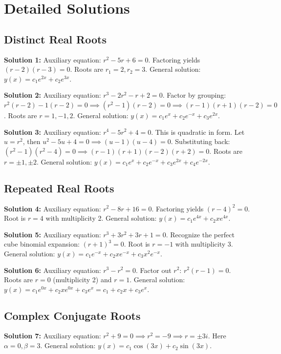 \documentclass[12pt]{article}
\begin{document}
\newpage

\section{Detailed Solutions}

\subsection*{Distinct Real Roots}
\textbf{Solution 1:} 
Auxiliary equation: $r^2 - 5r + 6 = 0$. 
Factoring yields $(r-2)(r-3) = 0$. 
Roots are $r_1 = 2, r_2 = 3$. 
General solution: $y(x) = c_1e^{2x} + c_2e^{3x}$.

\textbf{Solution 2:} 
Auxiliary equation: $r^3 - 2r^2 - r + 2 = 0$. 
Factor by grouping: $r^2(r-2) - 1(r-2) = 0 \implies (r^2-1)(r-2) = 0 \implies (r-1)(r+1)(r-2) = 0$. 
Roots are $r = 1, -1, 2$. 
General solution: $y(x) = c_1e^x + c_2e^{-x} + c_3e^{2x}$.

\textbf{Solution 3:} 
Auxiliary equation: $r^4 - 5r^2 + 4 = 0$. 
This is quadratic in form. Let $u = r^2$, then $u^2 - 5u + 4 = 0 \implies (u-1)(u-4) = 0$. 
Substituting back: $(r^2-1)(r^2-4) = 0 \implies (r-1)(r+1)(r-2)(r+2) = 0$. 
Roots are $r = \pm 1, \pm 2$. 
General solution: $y(x) = c_1e^x + c_2e^{-x} + c_3e^{2x} + c_4e^{-2x}$.

\subsection*{Repeated Real Roots}
\textbf{Solution 4:} 
Auxiliary equation: $r^2 - 8r + 16 = 0$. 
Factoring yields $(r-4)^2 = 0$. 
Root is $r = 4$ with multiplicity 2. 
General solution: $y(x) = c_1e^{4x} + c_2xe^{4x}$.

\textbf{Solution 5:} 
Auxiliary equation: $r^3 + 3r^2 + 3r + 1 = 0$. 
Recognize the perfect cube binomial expansion: $(r+1)^3 = 0$. 
Root is $r = -1$ with multiplicity 3. 
General solution: $y(x) = c_1e^{-x} + c_2xe^{-x} + c_3x^2e^{-x}$.

\textbf{Solution 6:} 
Auxiliary equation: $r^3 - r^2 = 0$. 
Factor out $r^2$: $r^2(r-1) = 0$. 
Roots are $r = 0$ (multiplicity 2) and $r = 1$. 
General solution: $y(x) = c_1e^{0x} + c_2xe^{0x} + c_3e^x = c_1 + c_2x + c_3e^x$.

\subsection*{Complex Conjugate Roots}
\textbf{Solution 7:} 
Auxiliary equation: $r^2 + 9 = 0 \implies r^2 = -9 \implies r = \pm 3i$. 
Here $\alpha = 0, \beta = 3$. 
General solution: $y(x) = c_1\cos(3x) + c_2\sin(3x)$.
\end{document}
